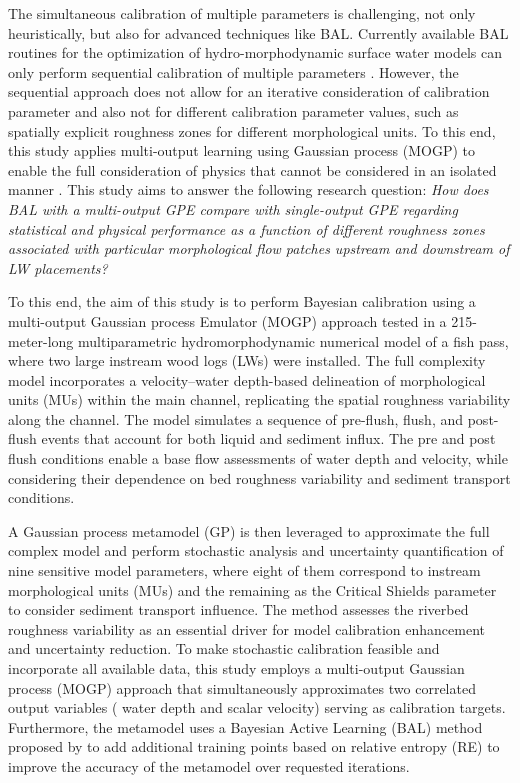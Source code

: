 \documentclass[draft,linenumbers,onecolumn]{agujournal2019} %
\begin{document}
The simultaneous calibration of multiple parameters is challenging, not only heuristically, but also for advanced techniques like BAL. Currently available BAL routines for the optimization of hydro-morphodynamic surface water models can only perform sequential calibration of multiple parameters \cite{mouris2023stability,schwindt2023bayesian}. However, the sequential approach does not allow for an iterative consideration of calibration parameter and also not for different calibration parameter values, such as spatially explicit roughness zones for different morphological units. To this end, this study applies multi-output learning using Gaussian process (MOGP) to enable the full consideration of physics that cannot be considered in an isolated manner \cite{bonilla2007multitask}.  This study aims to answer the following research question: \textit{How does BAL with a multi-output GPE compare with single-output GPE regarding statistical and physical performance as a function of different roughness zones associated with particular morphological flow patches upstream and downstream of LW placements?}







% 
To this end, the aim of this study is to perform Bayesian calibration using a multi-output Gaussian process Emulator (MOGP) approach tested in a 215-meter-long multiparametric hydromorphodynamic numerical model of a fish pass, where two large instream wood logs (LWs) were installed. The full complexity model incorporates a velocity–water depth-based delineation of morphological units (MUs) within the main channel, replicating the spatial roughness variability along the channel. The model simulates a sequence of pre-flush, flush, and post-flush events that account for both liquid and sediment influx. The pre and post flush conditions enable a base flow assessments of water depth and velocity, while considering their dependence on bed roughness variability and sediment transport conditions.

A Gaussian process metamodel (GP) is then leveraged to approximate the full complex model and perform stochastic analysis and uncertainty quantification of nine sensitive model parameters, where eight of them correspond to instream morphological units (MUs) and the remaining as the Critical Shields parameter to consider sediment transport influence. The method assesses the riverbed roughness variability as an essential driver for model calibration enhancement and uncertainty reduction. To make stochastic calibration feasible and incorporate all available data, this study employs a multi-output Gaussian process (MOGP) approach that simultaneously approximates two correlated output variables ( water depth and scalar velocity) serving as calibration targets.
Furthermore, the metamodel uses a Bayesian Active Learning (BAL) method proposed by  to add additional training points based on relative entropy (RE) to improve the accuracy of the metamodel over requested iterations. 
\end{document}
